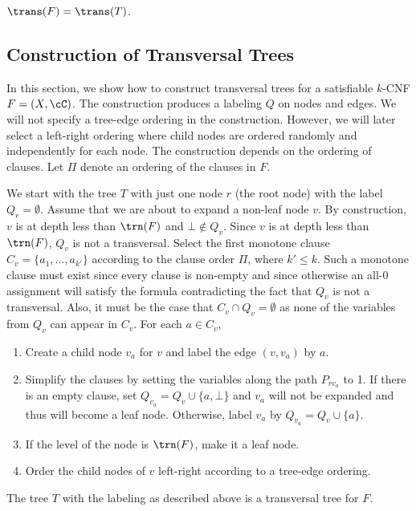 \begin{fact}
$\trans(F) = \trans(T)$.
\end{fact}


\subsection{Construction of Transversal Trees}

In this section, we show how to construct transversal trees for 
a satisfiable $k$-CNF 
$F=(X,\cC)$. 
The construction produces a labeling $Q$ on nodes and edges.
We will not specify a tree-edge ordering in the construction.
However, we will later select
a  left-right ordering where child nodes 
are ordered randomly and independently for each node.
The construction depends on the ordering of clauses.
Let $\Pi$ denote an ordering of the clauses in $F$.

We start with the tree $T$ with just one node $r$
(the root node) with the label  $Q_r =\emptyset$.
Assume that we are about to expand a non-leaf node $v$.
By construction, $v$ is at depth less than $\trn(F)$ and $\bot \not\in Q_v$.
Since $v$ is at depth less than $\trn(F)$, $Q_v$ is not a transversal.
Select the first monotone clause 
$C_v = \{a_1, \ldots, a_{k'}\}$ according to the clause order $\Pi$, where $k'\le k$.
Such a monotone clause must 
exist since every clause is non-empty and since
otherwise an all-0 assignment will satisfy the formula
contradicting the fact that $Q_v$ is not a 
transversal. 
Also, it must be the case that 
$C_v\cap Q_v = \emptyset$ as none 
of the variables from $Q_v$ can appear in $C_v$.
For each $a\in C_v$,
\begin{enumerate}
\item Create a child node $v_a$ for $v$ and label the edge $(v, v_a)$ by $a$. 
\item Simplify the clauses 
by setting the variables
along the path $P_{rv_a}$ to 1. 
If there is an empty clause, set $Q_{v_a} = Q_v\cup\{a,\bot\}$ 
and $v_a$ 
will not be expanded and thus will become a leaf node.
Otherwise,
label $v_a$ by $Q_{v_a} = Q_v\cup \{a\}$. 
\item If the level
of the node is $\trn(F)$, make it a leaf node.
\item Order the child nodes of $v$ left-right according to a 
tree-edge ordering.
\end{enumerate}

\begin{proposition}
\label{prop:general-tree-existence}
The tree $T$ with the labeling as described above is a transversal tree for $F$.
\end{proposition}

